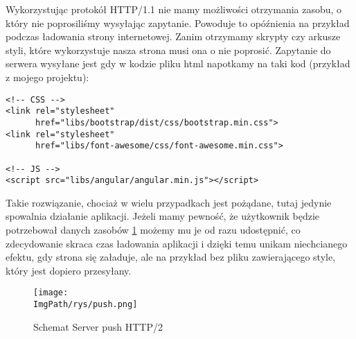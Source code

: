 \documentclass[a4paper,12pt,twoside,openany]{report}
\newcommand{\ImgPath}{.}
\newcommand{\tech}{\texttt}
\begin{document}
Wykorzystując protokół HTTP/1.1 nie mamy możliwości otrzymania zasobu, o który nie poprosiliśmy wysyłając zapytanie.
Powoduje to opóźnienia na przykład podczas ładowania strony internetowej.
Zanim otrzymamy skrypty czy arkusze styli, które wykorzystuje nasza strona musi ona o nie poprosić.
Zapytanie do serwera wysyłane jest gdy w kodzie pliku html napotkamy na taki kod (przykład z mojego projektu):
\begin{lstlisting}
<!-- CSS -->
<link rel="stylesheet"
	  href="libs/bootstrap/dist/css/bootstrap.min.css">
<link rel="stylesheet"
      href="libs/font-awesome/css/font-awesome.min.css">

<!-- JS -->
<script src="libs/angular/angular.min.js"></script>
\end{lstlisting}
Takie rozwiązanie, chociaż w wielu przypadkach jest pożądane, tutaj jedynie spowalnia działanie aplikacji.
Jeżeli mamy pewność, że użytkownik będzie potrzebował danych zasobów \ref{schematPush} możemy mu je od razu udostępnić, co zdecydowanie skraca czas ładowania aplikacji i dzięki temu unikam niechcianego efektu, gdy strona się załaduje, ale na przykład bez pliku zawierającego style, który jest dopiero przesyłany.
\begin{figure}[!htbp]
	\begin{center}
\centering
\texttt{[image: \\ImgPath/rys/push.png]}
\end{center}
	\caption{Schemat Server push HTTP/2}
	\label{schematPush}
\end{figure}

%
\end{document}

